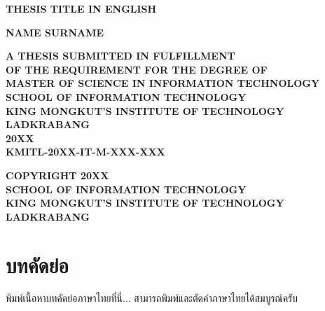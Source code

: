 \documentclass[12pt,a4paper]{report}
\begin{document}
\begin{titlepage}
\begin{center}
    {\fontsize{20pt}{24pt}\selectfont \textbf{THESIS TITLE IN ENGLISH}}\\
    
    \vspace{2.5cm}
    
    {\fontsize{18pt}{22pt}\selectfont \textbf{NAME SURNAME}}\\
    
    \vfill
    
    {\fontsize{18pt}{22pt}\selectfont \textbf{A THESIS SUBMITTED IN FULFILLMENT}}\\
    {\fontsize{18pt}{22pt}\selectfont \textbf{OF THE REQUIREMENT FOR THE DEGREE OF}}\\
    {\fontsize{18pt}{22pt}\selectfont \textbf{MASTER OF SCIENCE IN INFORMATION TECHNOLOGY}}\\
    {\fontsize{18pt}{22pt}\selectfont \textbf{SCHOOL OF INFORMATION TECHNOLOGY}}\\
    {\fontsize{18pt}{22pt}\selectfont \textbf{KING MONGKUT'S INSTITUTE OF TECHNOLOGY LADKRABANG}}\\
    {\fontsize{18pt}{22pt}\selectfont \textbf{20XX}}\\
    
    \vspace{1.5cm}
    {\fontsize{16pt}{20pt}\selectfont \textbf{KMITL-20XX-IT-M-XXX-XXX}}
\end{center}
\end{titlepage}

\clearpage
\vspace*{5cm}
\begin{center}
    {\fontsize{18pt}{22pt}\selectfont \textbf{COPYRIGHT 20XX}}\\
    \vspace{0.5cm}
    {\fontsize{18pt}{22pt}\selectfont \textbf{SCHOOL OF INFORMATION TECHNOLOGY}}\\
    \vspace{0.5cm}
    {\fontsize{18pt}{22pt}\selectfont \textbf{KING MONGKUT'S INSTITUTE OF TECHNOLOGY LADKRABANG}}
\end{center}
\clearpage

\chapter*{บทคัดย่อ}
พิมพ์เนื้อหาบทคัดย่อภาษาไทยที่นี่... สามารถพิมพ์และตัดคำภาษาไทยได้สมบูรณ์ครับ
\end{document}
